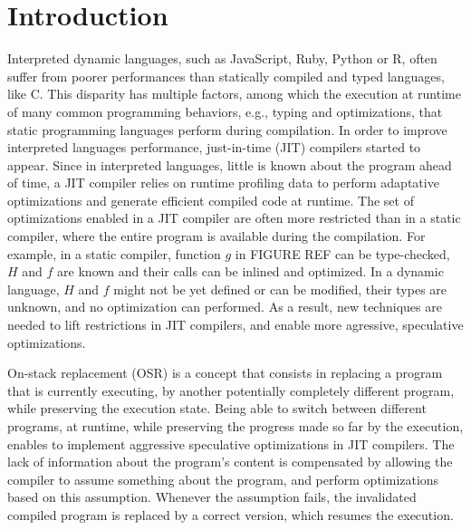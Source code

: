 
\chapter{Introduction} %

\label{Chapter1} %


\newcommand{\keyword}[1]{\textbf{#1}}
\newcommand{\tabhead}[1]{\textbf{#1}}
\newcommand{\code}[1]{\texttt{#1}}
\newcommand{\file}[1]{\texttt{\bfseries#1}}
\newcommand{\option}[1]{\texttt{\itshape#1}}


Interpreted dynamic languages, such as JavaScript, Ruby, Python or R, often suffer from poorer performances than statically compiled and typed languages, like C.
This disparity has multiple factors, among which the execution at runtime of many common programming behaviors, e.g., typing and optimizations, that static programming languages perform during compilation.
In order to improve interpreted languages performance, just-in-time (JIT) compilers started to appear.
Since in interpreted languages, little is known about the program ahead of time, a JIT compiler relies on runtime profiling data to perform adaptative optimizations and generate efficient compiled code at runtime.
The set of optimizations enabled in a JIT compiler are often more restricted than in a static compiler, where the entire program is available during the compilation.
For example, in a static compiler, function $g$ in FIGURE REF can be type-checked, $H$ and $f$ are known and their calls can be inlined and optimized.
In a dynamic language, $H$ and $f$ might not be yet defined or can be modified, their types are unknown, and no optimization can performed.
As a result, new techniques are needed to lift restrictions in JIT compilers, and enable more agressive, speculative optimizations.\\


On-stack replacement (OSR) is a concept that consists in replacing a program that is currently executing, by another potentially completely different program, while preserving the execution state.
Being able to switch between different programs, at runtime, while preserving the progress made so far by the execution, enables to implement aggressive speculative optimizations in JIT compilers.
The lack of information about the program's content is compensated by allowing the compiler to assume something about the program, and perform optimizations based on this assumption.
Whenever the assumption fails, the invalidated compiled program is replaced by a correct version, which resumes the execution.\\

